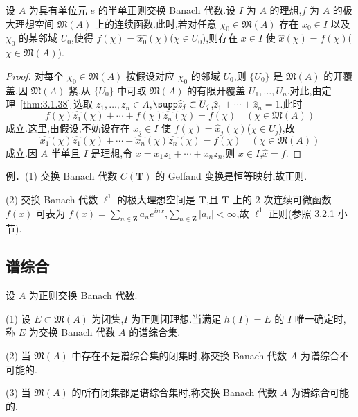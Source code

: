 \begin{corollary}\label{cor:3.1.39}
设 $A$ 为具有单位元 $e$ 的半单正则交换 Banach 代数.设 $I$ 为 $A$ 的理想,$f$ 为 $A$ 的极大理想空间 $\mathfrak{M}(A)$ 上的连续函数.此时,若对任意 $\chi_{0} \in \mathfrak{M}(A)$ 存在 $x_{0} \in I$ 以及 $\chi_{0}$ 的某邻域 $U_{0}$,使得 $f(\chi) = \widehat{x_{0}}(\chi)$($\chi \in U_{0}$),则存在 $x \in I$ 使 $\hat{x}(\chi) = f(\chi)$($\chi \in \mathfrak{M}(A)$).
\end{corollary}

\begin{proof}
对每个 $\chi_{0} \in \mathfrak{M}(A)$ 按假设对应 $\chi_{0}$ 的邻域 $U_{0}$,则 $\{U_{0}\}$ 是 $\mathfrak{M}(A)$ 的开覆盖,因 $\mathfrak{M}(A)$ 紧,从 $\{U_{0}\}$ 中可取 $\mathfrak{M}(A)$ 的有限开覆盖 $U_{1}, \ldots, U_{n}$.对此,由定理~\ref{thm:3.1.38} 选取 $z_{1}, \ldots, z_{n} \in A$,$\supp \widehat{z}_{j} \subset U_{j}$,$\widehat{z}_{1} + \cdots + \widehat{z}_{n} = 1$.此时
\begin{equation*}
f(\chi)\widehat{z_{1}}(\chi) + \cdots + f(\chi)\widehat{z_{n}}(\chi) = f(\chi) \quad (\chi \in \mathfrak{M}(A))
\end{equation*}
成立.这里,由假设,不妨设存在 $x_{j} \in I$ 使 $f(\chi) = \hat{x}_{j}(\chi)$($\chi \in U_{j}$),故
\begin{equation*}
\widehat{x_{1}}(\chi)\widehat{z_{1}}(\chi) + \cdots + \widehat{x_{n}}(\chi)\widehat{z_{n}}(\chi) = f(\chi) \quad (\chi \in \mathfrak{M}(A))
\end{equation*}
成立.因 $A$ 半单且 $I$ 是理想,令 $x = x_{1}z_{1} + \cdots + x_{n}z_{n}$,则 $x \in I$,$\hat{x} = f$.
\end{proof}

例．(1) 交换 Banach 代数 $C(\mathbf{T})$ 的 Gelfand 变换是恒等映射,故正则.

(2) 交换 Banach 代数 $\ell^{1}$ 的极大理想空间是 $\mathbf{T}$,且 $\mathbf{T}$ 上的 2 次连续可微函数 $f(x)$ 可表为 $f(x) = \sum_{n \in \mathbf{Z}} a_{n}e^{inx}$,$\sum_{n \in \mathbf{Z}} |a_{n}| < \infty$,故 $\ell^{1}$ 正则(参照 3.2.1 小节).

\subsection{谱综合}\label{sec:3.1.6}

\begin{definition}\label{def:3.1.40}
设 $A$ 为正则交换 Banach 代数.

(1) 设 $E \subset \mathfrak{M}(A)$ 为闭集,$I$ 为正则闭理想.当满足 $h(I) = E$ 的 $I$ 唯一确定时,称 $E$ 为交换 Banach 代数 $A$ 的谱综合集.

(2) 当 $\mathfrak{M}(A)$ 中存在不是谱综合集的闭集时,称交换 Banach 代数 $A$ 为谱综合不可能的.

(3) 当 $\mathfrak{M}(A)$ 的所有闭集都是谱综合集时,称交换 Banach 代数 $A$ 为谱综合可能的.
\end{definition}

